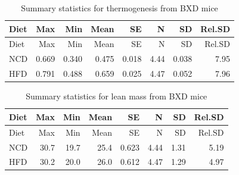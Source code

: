 \documentclass[]{article}
\newenvironment{Shaded}{\begin{snugshade}}{\end{snugshade}}
\newcommand{\DataTypeTok}[1]{\textcolor[rgb]{0.13,0.29,0.53}{#1}}
\newcommand{\DecValTok}[1]{\textcolor[rgb]{0.00,0.00,0.81}{#1}}
\newcommand{\KeywordTok}[1]{\textcolor[rgb]{0.13,0.29,0.53}{\textbf{#1}}}
\newcommand{\NormalTok}[1]{#1}
\newcommand{\OperatorTok}[1]{\textcolor[rgb]{0.81,0.36,0.00}{\textbf{#1}}}
\newcommand{\StringTok}[1]{\textcolor[rgb]{0.31,0.60,0.02}{#1}}
\begin{document}
\begin{longtable}[]{@{}lrrrrrrr@{}}
\caption{Summary statistics for thermogenesis from BXD
mice}\tabularnewline
\toprule
Diet & Max & Min & Mean & SE & N & SD & Rel.SD\tabularnewline
\midrule
\endfirsthead
\toprule
Diet & Max & Min & Mean & SE & N & SD & Rel.SD\tabularnewline
\midrule
\endhead
NCD & 0.669 & 0.340 & 0.475 & 0.018 & 4.44 & 0.038 & 7.95\tabularnewline
HFD & 0.791 & 0.488 & 0.659 & 0.025 & 4.47 & 0.052 & 7.96\tabularnewline
\bottomrule
\end{longtable}

\begin{Shaded}
\end{Shaded}

\begin{longtable}[]{@{}lrrrrrrr@{}}
\caption{Summary statistics for lean mass from BXD mice}\tabularnewline
\toprule
Diet & Max & Min & Mean & SE & N & SD & Rel.SD\tabularnewline
\midrule
\endfirsthead
\toprule
Diet & Max & Min & Mean & SE & N & SD & Rel.SD\tabularnewline
\midrule
\endhead
NCD & 30.7 & 19.7 & 25.4 & 0.623 & 4.44 & 1.31 & 5.19\tabularnewline
HFD & 30.2 & 20.0 & 26.0 & 0.612 & 4.47 & 1.29 & 4.97\tabularnewline
\bottomrule
\end{longtable}
\end{document}
